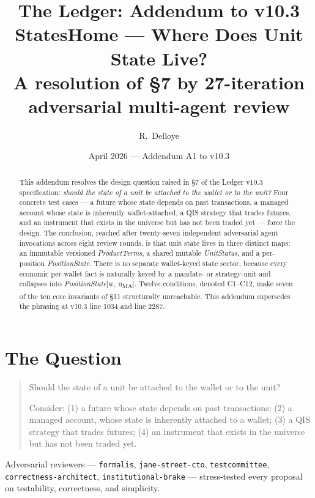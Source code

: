 \documentclass[11pt,a4paper]{article}
\title{The Ledger: Addendum to v10.3\\[6pt]
\large StatesHome --- Where Does Unit State Live?\\
\normalsize A resolution of \S 7 by 27-iteration adversarial multi-agent review}
\author{R.\ Delloye}
\date{April 2026 --- Addendum A1 to v10.3}
\begin{document}
\maketitle

\begin{abstract}
This addendum resolves the design question raised in \S 7 of the Ledger v10.3 specification: \emph{should the state of a unit be attached to the wallet or to the unit?} Four concrete test cases --- a future whose state depends on past transactions, a managed account whose state is inherently wallet-attached, a QIS strategy that trades futures, and an instrument that exists in the universe but has not been traded yet --- force the design. The conclusion, reached after twenty-seven independent adversarial agent invocations across eight review rounds, is that unit state lives in three distinct maps: an immutable versioned \textit{ProductTerms}, a shared mutable \textit{UnitStatus}, and a per-position \textit{PositionState}. There is no separate wallet-keyed state sector, because every economic per-wallet fact is naturally keyed by a mandate- or strategy-unit and collapses into \textit{PositionState}[w, u\textsubscript{MA}]. Twelve conditions, denoted C1--C12, make seven of the ten core invariants of \S 11 structurally unreachable. This addendum supersedes the phrasing at v10.3 line 1034 and line 2287.
\end{abstract}

\tableofcontents
\clearpage

\section{The Question}
\label{sec:question}

\begin{quote}
Should the state of a unit be attached to the wallet or to the unit?

Consider: (1) a future whose state depends on past transactions; (2) a managed account, whose state is inherently attached to a wallet; (3) a QIS strategy that trades futures; (4) an instrument that exists in the universe but has not been traded yet.
\end{quote}

\noindent Adversarial reviewers --- \texttt{formalis}, \texttt{jane-street-cto}, \texttt{testcommittee}, \texttt{correctness-architect}, \texttt{institutional-brake} --- stress-tested every proposal on testability, correctness, and simplicity.
\end{document}
